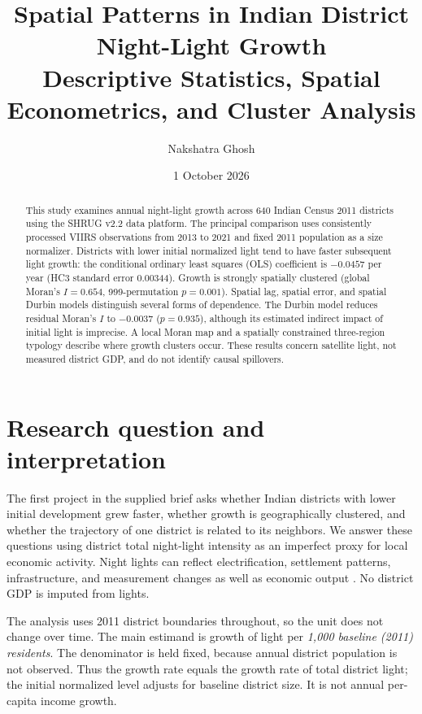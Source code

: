 \documentclass[11pt,a4paper]{article}
\title{Spatial Patterns in Indian District Night-Light Growth\\
\large Descriptive Statistics, Spatial Econometrics, and Cluster Analysis}
\author{Nakshatra Ghosh}
\date{1 October 2026}
\begin{document}
\maketitle
\begin{abstract}
This study examines annual night-light growth across 640 Indian Census 2011 districts using the SHRUG v2.2 data platform. The principal comparison uses consistently processed VIIRS observations from 2013 to 2021 and fixed 2011 population as a size normalizer. Districts with lower initial normalized light tend to have faster subsequent light growth: the conditional ordinary least squares (OLS) coefficient is $-0.0457$ per year (HC3 standard error 0.00344). Growth is strongly spatially clustered (global Moran's $I=0.654$, 999-permutation $p=0.001$). Spatial lag, spatial error, and spatial Durbin models distinguish several forms of dependence. The Durbin model reduces residual Moran's $I$ to $-0.0037$ ($p=0.935$), although its estimated indirect impact of initial light is imprecise. A local Moran map and a spatially constrained three-region typology describe where growth clusters occur. These results concern satellite light, not measured district GDP, and do not identify causal spillovers.
\end{abstract}

\tableofcontents
\clearpage

\section{Research question and interpretation}
The first project in the supplied brief asks whether Indian districts with lower initial development grew faster, whether growth is geographically clustered, and whether the trajectory of one district is related to its neighbors. We answer these questions using district total night-light intensity as an imperfect proxy for local economic activity. Night lights can reflect electrification, settlement patterns, infrastructure, and measurement changes as well as economic output \cite{henderson2012,asher2021}. No district GDP is imputed from lights.

The analysis uses 2011 district boundaries throughout, so the unit does not change over time. The main estimand is growth of light per \emph{1,000 baseline (2011) residents}. The denominator is held fixed, because annual district population is not observed. Thus the growth rate equals the growth rate of total district light; the initial normalized level adjusts for baseline district size. It is not annual per-capita income growth.
\end{document}
